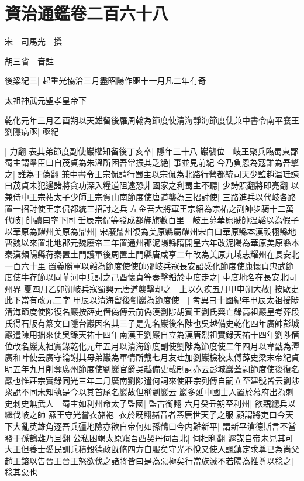 \chapter{資治通鑑卷二百六十八}
宋　司馬光　撰

胡三省　音註

後梁紀三|{
	起重光協洽三月盡昭陽作噩十一月凡二年有奇}


太祖神武元聖孝皇帝下

乾化元年三月乙酉朔以天雄留後羅周翰為節度使清海靜海節度使兼中書令南平襄王劉隱病亟|{
	亟紀}


|{
	力翻}
表其弟節度副使巖權知留後丁亥卒|{
	隱年三十八}
巖襲位　岐王聚兵臨蜀東鄙蜀主謂羣臣曰自茂貞為朱溫所困吾常振其乏絶|{
	事並見前紀}
今乃負恩為寇誰為吾擊之|{
	誰為于偽翻}
兼中書令王宗侃請行蜀主以宗侃為北路行營都統司天少監趙温珪諫曰茂貞未犯邊諸將貪功深入糧道阻遠恐非國家之利蜀主不聽|{
	少詩照翻將即亮翻}
以兼侍中王宗祐太子少師王宗賀山南節度使唐道襲為三招討使|{
	三路進兵以代岐各路置一招討使王宗侃都統三招討之兵}
左金吾大將軍王宗紹為宗祐之副帥步騎十二萬代岐|{
	帥讀曰率下同}
壬辰宗侃等發成都旌旗數百里　岐王募華原賊帥温韜以為假子以華原為耀州美原為鼎州|{
	宋廢鼎州復為美原縣屬耀州宋白曰華原縣本漢祋栩縣地曹魏以來置北地郡元魏廢帝三年置通州郡泥陽縣隋開皇六年改泥陽為華原美原縣本秦漢頻陽縣苻秦置土門護軍後周置土門縣唐咸亨二年改為美原九域志耀州在長安北一百六十里}
置義勝軍以韜為節度使使帥邠岐兵寇長安詔感化節度使康懷貞忠武節度使牛存節以同華河中兵討之己酉懷貞等奏擊韜於車度走之|{
	車度地名在長安北同州界}
夏四月乙卯朔岐兵寇蜀興元唐道襲擊却之　上以久疾五月甲申朔大赦|{
	按歐史此下當有改元二字}
甲辰以清海留後劉巖為節度使　|{
	考異曰十國紀年甲辰太祖授陟清海節度使陟復名巖按薛史僭偽傳云前偽漢劉陟胡賓王劉氏興亡錄高祖巖皇考葬段氏得石版有篆文曰隱台巖因名其三子是先名巖後名陟也吳越備史乾化四年廣帥彭城巖遣陳用拙來使吳錄天祐十四年南漢王劉巖自立為漢唐烈祖實錄天祐十四年劉陟僭位改名巖太祖實錄乾化元年五月以清海節度副使劉陟為節度使二年四月以韋戩為潭廣和叶使云廣守淪謝其母弟巖為軍情所戴七月友珪加劉巖檢校太傅薛史梁末帝紀貞明五年九月削奪廣州節度使劉巖官爵吳越備史載制詞亦云彭城巖蓋嗣節度使後復名巖也惟莊宗實錄同光三年二月廣南劉陟遣何詞來使莊宗列傳自嗣立至建號皆云劉陟衆說不同未知孰是今以其首尾名巖故但稱劉巖云}
巖多延中國士人置於幕府出為刺史刺史無武人　蜀主如利州命太子監國|{
	監古銜翻}
六月癸丑朔至利州|{
	欲親總兵以繼伐岐之師}
燕王守光嘗衣赭袍|{
	衣於旣翻赭音者蓋唐世天子之服}
顧謂將吏曰今天下大亂英雄角逐吾兵彊地險亦欲自帝何如孫鶴曰今内難新平|{
	謂新平滄德斯言不當發于孫鶴難乃旦翻}
公私困竭太原窺吾西契丹伺吾北|{
	伺相利翻}
遽謀自帝未見其可大王但養士愛民訓兵積穀德政旣脩四方自服矣守光不悅又使人諷鎮定求尊已為尚父趙王鎔以告晉王晉王怒欲伐之諸將皆曰是為惡極矣行當族滅不若陽為推尊以稔之|{
	稔其惡也}

